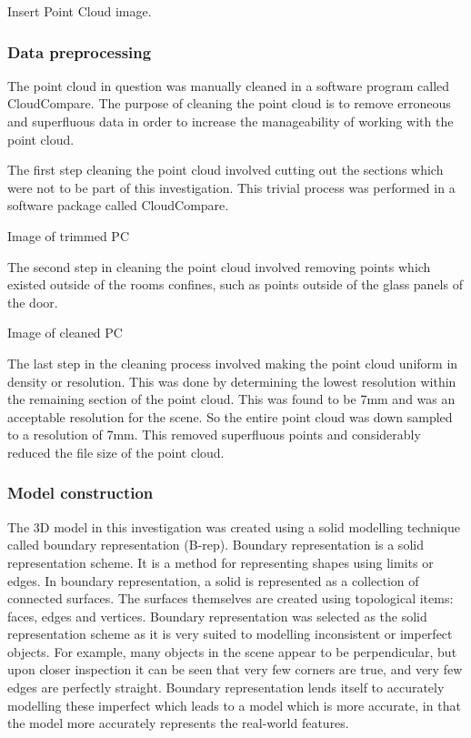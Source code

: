 \documentclass[11pt,a4paper]{report}
\begin{document}
				{{Insert Point Cloud image}}.
				
			\subsubsection{Data preprocessing}
				The point cloud in question was manually cleaned in a software program called CloudCompare. The purpose of cleaning the point cloud is to remove erroneous and superfluous data in order to increase the manageability of working with the point cloud.
	
				The first step cleaning the point cloud involved cutting out the sections which were not to be part of this investigation. This trivial process was performed in a software package called CloudCompare.
				
				{{Image of trimmed PC}}
				
				The second step in cleaning the point cloud involved removing points which existed outside of the rooms confines, such as points outside of the glass panels of the door.
				
				{{Image of cleaned PC}}
 
				The last step in the cleaning process involved making the point cloud uniform in density or resolution. This was done by determining the lowest resolution within the remaining section of the point cloud. This was found to be 7mm and was an acceptable resolution for the scene. So the entire point cloud was down sampled to a resolution of 7mm. This removed superfluous points and considerably reduced the file size of the point cloud.
			
			\subsubsection{Model construction}
				The 3D model in this investigation was created using a solid modelling technique called boundary representation (B-rep). Boundary representation is a solid representation scheme. It is a method for representing shapes using limits or edges. In boundary representation, a solid is represented as a collection of connected surfaces. The surfaces themselves are created using topological items: faces, edges and vertices.
				\cite{hongxin_zhang_introduction_2007}
				Boundary representation was selected as the solid representation scheme as it is very suited to modelling inconsistent or imperfect objects. For example, many objects in the scene appear to be perpendicular, but upon closer inspection it can be seen that very few corners are true, and very few edges are perfectly straight. Boundary representation lends itself to accurately modelling these imperfect which leads to a model which is more accurate, in that the model more accurately represents the real-world features.
				
\end{document}
